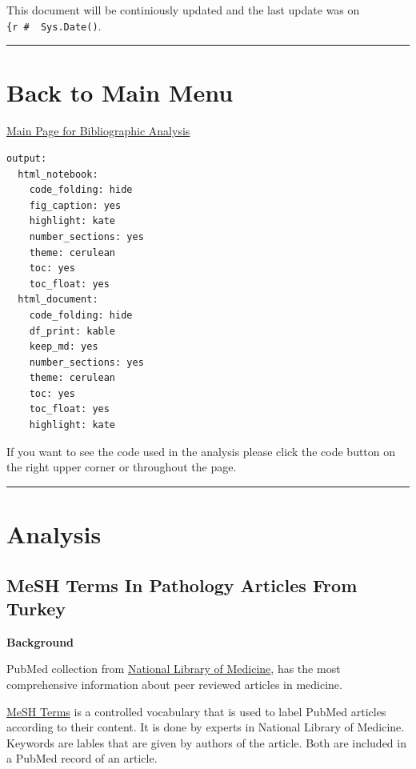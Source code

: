 \documentclass[
]{book}
\begin{document}
This document will be continiously updated and the last update was on \texttt{\{r\ \#\ \ Sys.Date()}.

\begin{center}\rule{0.5\linewidth}{0.5pt}\end{center}

\hypertarget{back-to-main-menu}{%
\chapter{Back to Main Menu}\label{back-to-main-menu}}

\href{https://sbalci.github.io/pubmed/BibliographicStudies.html}{Main Page for Bibliographic Analysis}

\begin{verbatim}
output: 
  html_notebook: 
    code_folding: hide
    fig_caption: yes
    highlight: kate
    number_sections: yes
    theme: cerulean
    toc: yes
    toc_float: yes
  html_document: 
    code_folding: hide
    df_print: kable
    keep_md: yes
    number_sections: yes
    theme: cerulean
    toc: yes
    toc_float: yes
    highlight: kate
\end{verbatim}

If you want to see the code used in the analysis please click the code button on the right upper corner or throughout the page.

\begin{center}\rule{0.5\linewidth}{0.5pt}\end{center}

\hypertarget{analysis-2}{%
\chapter{Analysis}\label{analysis-2}}

\hypertarget{mesh-terms-in-pathology-articles-from-turkey}{%
\section{MeSH Terms In Pathology Articles From Turkey}\label{mesh-terms-in-pathology-articles-from-turkey}}

\textbf{Background}

PubMed collection from \href{https://www.ncbi.nlm.nih.gov/pubmed/}{National Library of Medicine}, has the most comprehensive information about peer reviewed articles in medicine.

\href{https://www.nlm.nih.gov/pubs/factsheets/mesh.html}{MeSH Terms} is a controlled vocabulary that is used to label PubMed articles according to their content. It is done by experts in National Library of Medicine. Keywords are lables that are given by authors of the article. Both are included in a PubMed record of an article.
\end{document}
